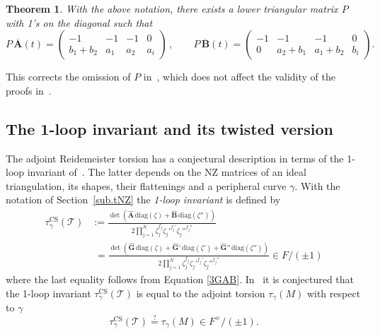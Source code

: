 \documentclass[12pt,reqno]{amsart}
\newtheorem{theorem}{Theorem}[section]
\theoremstyle{definition}
\def\calT{\mathcal T}
\def\be{\begin{equation}}
\def\ee{\end{equation}}
\def\CS{\mathrm{CS}}
\begin{document}
\begin{theorem}
\label{thm.NZpachner}
With the above notation, there exists  a lower triangular matrix $P$ with 1's on the diagonal such that 
\begin{equation} 
\label{3AB}
P \, \overline{\mathbf{A}}(t) = \begin{pmatrix} -1 & -1 & -1  & 0 \\ 
  b_1+b_2 & a_1 & a_2 & a_i \end{pmatrix}\,,\qquad
P \, \overline{\mathbf{B}}(t) = \begin{pmatrix} -1 & -1 & -1 & 0 \\
  0 & a_2+b_1 & a_1+b_2 & b_i 
\end{pmatrix} .
\end{equation}
\end{theorem}
This corrects the omission of $P$ in~\cite[Eqn.(3.27)]{DG1}, which does not affect
the validity of the proofs in~\cite{DG1}.

\subsection{The 1-loop invariant and its twisted version}
\label{sub.1loopt}

The adjoint Reidemeister torsion has a conjectural description in terms of the
1-loop invariant of~\cite{DG1}. The latter depends on the NZ matrices
of an ideal triangulation, its shapes, their flattenings and a peripheral
curve $\gamma$. With the notation of Section~\ref{sub.tNZ}
the \emph{1-loop invariant} is defined by
\be
\label{1loop}
\begin{aligned}
  \tau^\CS_\gamma(\calT)
& := \frac{\det \left(  \widehat{\mathbf{A}}  \, \mathrm{diag}(\zeta) +
    \widehat{\mathbf{B}} \, \mathrm{diag}(\zeta'') \right)}{
2\prod_{j=1}^N\zeta_j^{f_j} \zeta_j'^{f_j'} \zeta_j''^{f_j''}} \\
& \,\,=
\frac{\det \left(  \widehat{\mathbf{G}}\, \mathrm{diag}(\zeta)
	+\widehat{\mathbf{G}}' \, \mathrm{diag}(\zeta')+\widehat{\mathbf{G}}'' \,
	\mathrm{diag}(\zeta'') \right)}{
	2\prod_{j=1}^N\zeta_j^{f_j} \zeta_j'^{f_j'} \zeta_j''^{f_j''}} 
 \in F/ (\pm1)
\end{aligned}
\ee
where the last equality follows from Equation \eqref{3GAB}.
In~\cite{DG1} it is conjectured that the 1-loop invariant $\tau^\CS_\gamma(\calT)$ is
equal to the adjoint torsion $\tau_\gamma(M)$ with respect to
$\gamma$
\be
\label{conj.DG}
\tau^\CS_\gamma(\calT) \stackrel{?}{=}  \tau_\gamma(M)  \in F^\times / (\pm1)  .
\ee
\end{document}
